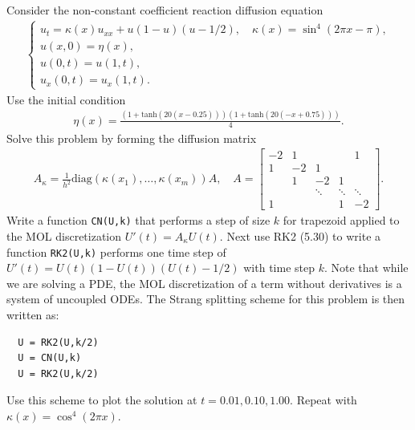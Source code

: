 \documentclass[12pt]{report}
\begin{document}
\begin{problem}
    Consider the non-constant coefficient reaction diffusion equation
  \begin{align*}
    \begin{cases}
      u_t = \kappa(x) u_{xx} + u(1-u)(u-1/2), \quad \kappa(x) = \sin^4(2\pi x - \pi),\\
      u(x,0) = \eta(x),\\
      u(0,t) = u(1,t),\\
      u_x(0,t) = u_x(1,t).
    \end{cases}
  \end{align*}
  Use the initial condition
  \begin{align*}
    \eta(x) = \frac{ ( 1 + \mathrm{tanh}(20(x-0.25)) ) ( 1 + \mathrm{tanh}(20(-x+0.75)))}{4}.
  \end{align*}
  Solve this problem by forming the diffusion matrix
  \begin{align*}
    A_{\kappa} = \frac{1}{h^2} \mathrm{diag}(\kappa(x_1),\ldots,\kappa(x_m)) A, \quad A  = \begin{bmatrix}
-2  & 1 &&& 1\\
1 & -2 & 1 \\
& 1 & -2 & 1\\
&& \ddots & \ddots & \ddots \\
1&&& 1 & -2 \end{bmatrix}.
  \end{align*}
  Write a function {\tt CN(U,k)} that performs a step of size $k$ for trapezoid applied to the MOL discretization $U'(t) = A_{\kappa} U(t)$.  Next use RK2 (5.30) to write a function {\tt RK2(U,k)} performs one time step of $U'(t) = U(t)(1-U(t))(U(t) - 1/2)$ with time step $k$.  Note that while we are solving a PDE, the MOL discretization of a term without derivatives is a system of uncoupled ODEs.  The Strang splitting scheme for this problem is then written as:
\begin{verbatim}
  U = RK2(U,k/2)
  U = CN(U,k)
  U = RK2(U,k/2)
\end{verbatim}
Use this scheme to plot the solution at $t = 0.01,0.10,1.00$.  Repeat with $\kappa(x) = \cos^4(2\pi x)$.
\end{problem}
\end{document}
